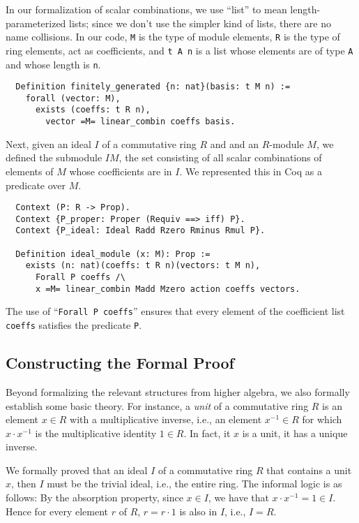 \documentclass{article}
\begin{document}
In our formalization of scalar combinations, we use  ``list'' to mean
length-parameterized lists; since we don't use the simpler kind of lists, there
are no name collisions. In our code, \texttt{M} is the type of module elements,
\texttt{R} is the type of ring elements, act as coefficients, and
\texttt{t A n} is a list whose elements are of type \texttt{A} and whose length
is \texttt{n}.



\begin{verbatim}
  Definition finitely_generated {n: nat}(basis: t M n) :=
    forall (vector: M),
      exists (coeffs: t R n),
        vector =M= linear_combin coeffs basis.
\end{verbatim}

Next, given an ideal \(I\) of a commutative ring $R$ and and an $R$-module
\(M\),  we defined the submodule $IM$, the set consisting of all scalar
combinations of elements of \(M\) whose coefficients are in  \(I\). We
represented this in Coq as a predicate over \(M\).

\begin{verbatim}
  Context (P: R -> Prop).
  Context {P_proper: Proper (Requiv ==> iff) P}.
  Context {P_ideal: Ideal Radd Rzero Rminus Rmul P}.
  
  Definition ideal_module (x: M): Prop :=
    exists (n: nat)(coeffs: t R n)(vectors: t M n),
      Forall P coeffs /\
      x =M= linear_combin Madd Mzero action coeffs vectors.
\end{verbatim}

The use of  ``\verb|Forall P coeffs|'' ensures that every element of the
coefficient list \texttt{coeffs} satisfies the predicate \texttt{P}.  

\subsection{Constructing the Formal Proof}
Beyond formalizing the relevant structures from higher algebra, we also
formally establish some basic theory. For instance, a \emph{unit} of a
commutative ring $R$ is an element $x \in R$ with a multiplicative inverse,
i.e., an element $x^{-1} \in R$ for which $x \cdot x^{-1}$ is the
multiplicative identity $1 \in R$.  In fact, it $x$ is a unit, it has a unique  inverse. 
 
We formally proved that an ideal $I$ of a commutative ring $R$ that contains a
unit $x$, then $I$ must be the trivial ideal, i.e., the entire ring.  The
informal logic is as follows:  By the absorption property, since $x \in I$, we
have that $x \cdot x^{-1} = 1 \in I$.  Hence for every element $r$ of $R$,
$r = r \cdot 1$ is also in $I$, i.e., $I=R$. 
\end{document}
